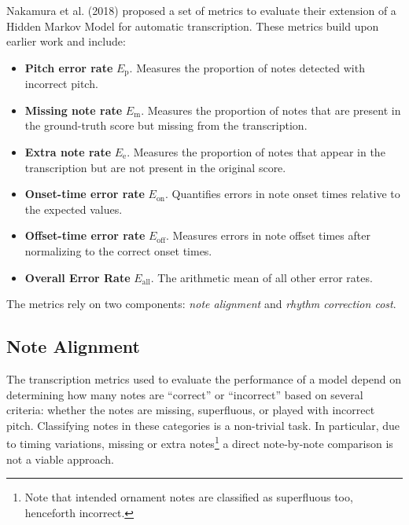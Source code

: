 Nakamura et al. (2018) proposed a set of metrics to evaluate their extension of a Hidden Markov Model \cite{Nakamura2018} for automatic transcription. These metrics build upon earlier work \cite{Nakamura2017a} and include: \begin{itemize}
	\item \textbf{Pitch error rate} $E_{\textrm{p}}$. Measures the proportion of notes detected with incorrect pitch.
	\item \textbf{Missing note rate} $E_{\textrm{m}}$. Measures the proportion of notes that are present in the ground-truth score but missing from the transcription.
	\item \textbf{Extra note rate} $E_{\textrm{e}}$. Measures the proportion of notes that appear in the transcription but are not present in the original score.
	\item \textbf{Onset-time error rate} $E_{\textrm{on}}$. Quantifies errors in note onset times relative to the expected values.
	\item \textbf{Offset-time error rate} $E_{\textrm{off}}$. Measures errors in note offset times after normalizing to the correct onset times.
	\item \textbf{Overall Error Rate} $E_{\textrm{all}}$. The arithmetic mean of all other error rates.
\end{itemize}

The metrics rely on two components: \emph{note alignment} and \emph{rhythm correction cost}.

\subsection{Note Alignment}

The transcription metrics used to evaluate the performance of a model depend on determining how many notes are ``correct'' or ``incorrect'' based on several criteria: whether the notes are missing, superfluous, or played with incorrect pitch. Classifying notes in these categories is a non-trivial task. In particular, due to timing variations, missing or extra notes\footnote{Note that intended ornament notes are classified as superfluous too, henceforth incorrect.} a direct note-by-note comparison is not a viable approach.

